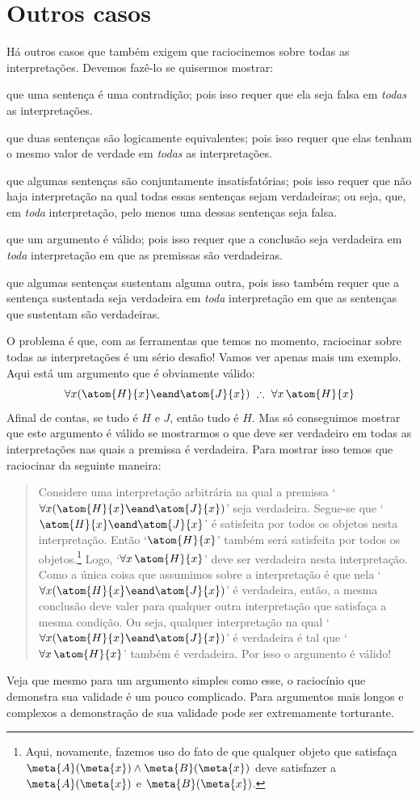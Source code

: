 \section{Outros casos}
Há outros casos que também exigem que raciocinemos sobre todas as interpretações. Devemos fazê-lo se quisermos mostrar:
	\begin{ebullet}
	\item que uma sentença é uma contradição; pois isso requer que ela seja falsa em \emph{todas} as interpretações.
	\item que duas sentenças são logicamente equivalentes; pois isso requer que elas tenham o mesmo valor de verdade em \emph{todas} as interpretações.
	\item que algumas sentenças são conjuntamente insatisfatórias; pois isso requer que não haja interpretação na qual todas essas sentenças sejam verdadeiras; ou seja, que, em \emph{toda} interpretação, pelo menos uma dessas sentenças seja falsa.
	\item que um argumento é válido; pois isso requer que a conclusão seja verdadeira em \emph{toda} interpretação em que as premissas são verdadeiras.
	\item que algumas sentenças sustentam alguma outra, pois isso também requer que a sentença sustentada seja verdadeira em \emph{toda} interpretação em que as sentenças que sustentam são verdadeiras.
	\end{ebullet}
O problema é que, com as ferramentas que temos no momento, raciocinar sobre todas as interpretações é um sério desafio! Vamos ver apenas mais um exemplo. Aqui está um argumento que é obviamente válido:
	$$\forall x(\atom{H}{x} \eand \atom{J}{x}) \ \therefore \ \forall x\, \atom{H}{x}$$
Afinal de contas, se tudo é $H$ e $J$, então tudo é $H$.
Mas só conseguimos mostrar que este argumento é válido se mostrarmos o que deve ser verdadeiro em todas as interpretações nas quais a premissa é verdadeira.
Para mostrar isso temos que raciocinar da seguinte maneira:
	\begin{quote}
		Considere uma interpretação arbitrária na qual a premissa `$\forall x(\atom{H}{x} \eand \atom{J}{x})$' seja verdadeira.
		Segue-se que `$\atom{H}{x} \eand \atom{J}{x}$' é satisfeita por todos os objetos nesta interpretação.
		Então `$\atom{H}{x}$' também será satisfeita por todos os objetos.\footnote{
			Aqui, novamente, fazemos uso do fato de que qualquer objeto que satisfaça $\meta{A}(\meta{x}) \land \meta{B}(\meta{x})$ deve satisfazer a $\meta{A}(\meta{x})$ e $\meta{B}(\meta{x})$.
		}
		Logo, `$\forall x\, \atom{H}{x}$' deve ser verdadeira nesta interpretação.
		Como a única coisa que assumimos sobre a interpretação é que nela `$\forall x(\atom{H}{x} \eand \atom{J}{x})$' é verdadeira, então, a mesma conclusão deve valer para qualquer outra interpretação que satisfaça a mesma condição.
		Ou seja, qualquer interpretação na qual `$\forall x(\atom{H}{x} \eand \atom{J}{x})$' é verdadeira é tal que `$\forall x\, \atom{H}{x}$' também é verdadeira.
		Por isso o argumento é válido!
\end{quote}
Veja que mesmo para um argumento simples como esse, o raciocínio que demonstra sua validade é um pouco complicado. Para argumentos mais longos e complexos a demonstração de sua validade pode ser extremamente torturante.

